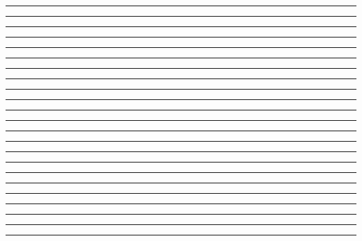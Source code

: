 \documentclass{article}
\begin{document}
\newpage
\noindent{}\rule{1cm}{0.025cm}\framebox{\rule{1cm}{1cm}}

\newpage
\noindent{}\rule{1cm}{0.025cm}

\newpage
\noindent{}\rule{1cm}{0.025cm}

\newpage
\noindent{}\rule{1cm}{0.025cm}

\newpage
\noindent{}\rule{1cm}{0.025cm}

\newpage
\noindent{}\rule{1cm}{0.025cm}

\newpage
\noindent{}\rule{1cm}{0.025cm}

\newpage
\noindent{}\rule{1cm}{0.025cm}

\newpage
\noindent{}\rule{1cm}{0.025cm}

\newpage
\noindent{}\rule{1cm}{0.025cm}

\newpage
\noindent{}\rule{1cm}{0.025cm}

\newpage
\noindent{}\rule{1cm}{0.025cm}

\newpage
\noindent{}\rule{1cm}{0.025cm}

\newpage
\noindent{}\rule{1cm}{0.025cm}

\newpage
\noindent{}\rule{1cm}{0.025cm}

\newpage
\noindent{}\rule{1cm}{0.025cm}

\newpage
\noindent{}\rule{1cm}{0.025cm}

\newpage
\noindent{}\rule{1cm}{0.025cm}

\newpage
\noindent{}\rule{1cm}{0.025cm}

\newpage
\noindent{}\rule{1cm}{0.025cm}

\newpage
\noindent{}\rule{1cm}{0.025cm}

\newpage
\noindent{}\rule{1cm}{0.025cm}

\newpage
\noindent{}\rule{1cm}{0.025cm}
\end{document}
